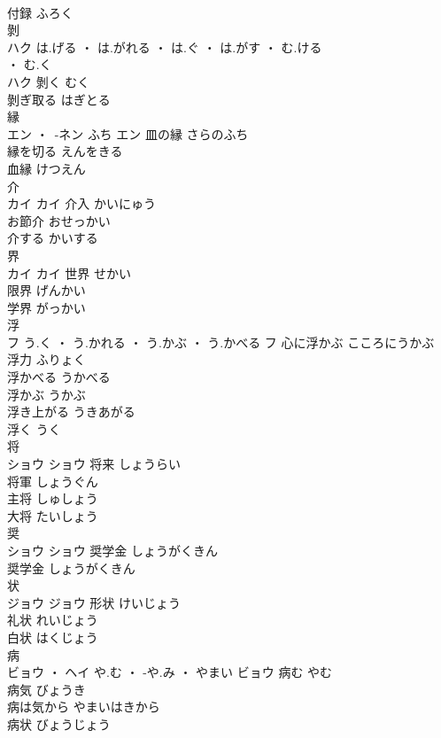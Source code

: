 \documentclass[8pt]{extreport}
\begin{document}
\begin{CJK}{UTF8}{min}
\\	付録	ふろく	
\\	剝	
\\	ハク	は.げる ・ は.がれる ・ は.ぐ ・ は.がす ・ む.ける
\\	・ む.く
\\	ハク	剝く	むく	
\\	剝ぎ取る	はぎとる	
\\	縁	
\\	エン ・ -ネン	ふち	エン	皿の縁	さらのふち	
\\	縁を切る	えんをきる	
\\	血縁	けつえん	
\\	介	
\\	カイ		カイ	介入	かいにゅう	
\\	お節介	おせっかい	
\\	介する	かいする	
\\	界	
\\	カイ		カイ	世界	せかい	
\\	限界	げんかい	
\\	学界	がっかい	
\\	浮	
\\	フ	う.く ・ う.かれる ・ う.かぶ ・ う.かべる	フ	心に浮かぶ	こころにうかぶ	
\\	浮力	ふりょく	
\\	浮かべる	うかべる	
\\	浮かぶ	うかぶ	
\\	浮き上がる	うきあがる	
\\	浮く	うく	
\\	将	
\\	ショウ		ショウ	将来	しょうらい	
\\	将軍	しょうぐん	
\\	主将	しゅしょう	
\\	大将	たいしょう	
\\	奨	
\\	ショウ		ショウ	奨学金	しょうがくきん	
\\	奨学金	しょうがくきん	
\\	状	
\\	ジョウ		ジョウ	形状	けいじょう	
\\	礼状	れいじょう	
\\	白状	はくじょう	
\\	病	
\\	ビョウ ・ ヘイ	や.む ・ -や.み ・ やまい	ビョウ	病む	やむ	
\\	病気	びょうき	
\\	病は気から	やまいはきから	
\\	病状	びょうじょう	

\end{CJK}
\end{document}
